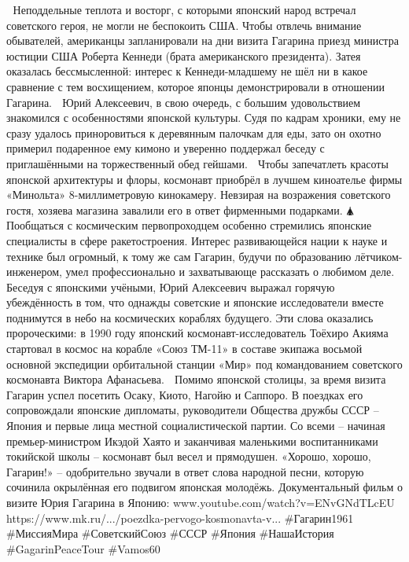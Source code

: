 🔸 Неподдельные теплота и восторг, с которыми японский народ встречал советского героя, не могли не беспокоить США. Чтобы отвлечь внимание обывателей, американцы запланировали на дни визита Гагарина приезд министра юстиции США Роберта Кеннеди (брата американского президента). Затея оказалась бессмысленной: интерес к Кеннеди-младшему не шёл ни в какое сравнение с тем восхищением, которое японцы демонстрировали в отношении Гагарина.
🎎 Юрий Алексеевич, в свою очередь, с большим удовольствием знакомился с особенностями японской культуры. Судя по кадрам хроники, ему не сразу удалось приноровиться к деревянным палочкам для еды, зато он охотно примерил подаренное ему кимоно и уверенно поддержал беседу с приглашёнными на торжественный обед гейшами. 
📸 Чтобы запечатлеть красоты японской архитектуры и флоры, космонавт приобрёл в лучшем киноателье фирмы «Минольта» 8-миллиметровую кинокамеру. Невзирая на возражения советского гостя, хозяева магазина завалили его в ответ фирменными подарками.
🛦 Пообщаться с космическим первопроходцем особенно стремились японские специалисты в сфере ракетостроения. Интерес развивающейся нации к науке и технике был огромный, к тому же сам Гагарин, будучи по образованию лётчиком-инженером, умел профессионально и захватывающе рассказать о любимом деле. 
🤝 Беседуя с японскими учёными, Юрий Алексеевич выражал горячую убеждённость в том, что однажды советские и японские исследователи вместе поднимутся в небо на космических кораблях будущего. Эти слова оказались пророческими: в 1990 году японский космонавт-исследователь Тоёхиро Акияма стартовал в космос на корабле «Союз ТМ-11» в составе экипажа восьмой основной экспедиции орбитальной станции «Мир» под командованием советского космонавта Виктора Афанасьева.
🗻 Помимо японской столицы, за время визита Гагарин успел посетить Осаку, Киото, Нагойю и Саппоро. В поездках его сопровождали японские дипломаты, руководители Общества дружбы СССР – Япония и первые лица местной социалистической партии. Со всеми – начиная премьер-министром Икэдой Хаято и заканчивая маленькими воспитанниками токийской школы – космонавт был весел и прямодушен. «Хорошо, хорошо, Гагарин!» – одобрительно звучали в ответ слова народной песни, которую сочинила окрылённая его подвигом японская молодёжь.
Документальный фильм о визите Юрия Гагарина в Японию: 
www.youtube.com/watch?v=ENvGNdTLcEU 
🔗 https://www.mk.ru/.../poezdka-pervogo-kosmonavta-v...
#Гагарин1961 #МиссияМира #СоветскийСоюз #СССР #Япония #НашаИстория #GagarinPeaceTour #Vamos60
